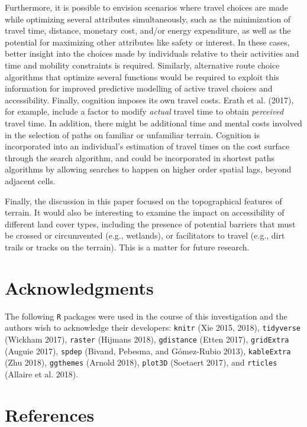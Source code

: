 \documentclass[]{elsarticle} %
\begin{document}
Furthermore, it is possible to envision scenarios where travel choices
are made while optimizing several attributes simultaneously, such as the
minimization of travel time, distance, monetary cost, and/or energy
expenditure, as well as the potential for maximizing other attributes
like safety or interest. In these cases, better insight into the choices
made by individuals relative to their activities and time and mobility
constraints is required. Similarly, alternative route choice algorithms
that optimize several functions would be required to exploit this
information for improved predictive modelling of active travel choices
and accessibility. Finally, cognition imposes its own travel costs.
Erath et al. (2017), for example, include a factor to modify
\emph{actual} travel time to obtain \emph{perceived} travel time. In
addition, there might be additional time and mental costs involved in
the selection of paths on familiar or unfamiliar terrain. Cognition is
incorporated into an individual's estimation of travel times on the cost
surface through the search algorithm, and could be incorporated in
shortest paths algorithms by allowing searches to happen on higher order
spatial lags, beyond adjacent cells.

Finally, the discussion in this paper focused on the topographical
features of terrain. It would also be interesting to examine the impact
on accessibility of different land cover types, including the presence
of potential barriers that must be crossed or circumvented (e.g.,
wetlands), or facilitators to travel (e.g., dirt trails or tracks on the
terrain). This is a matter for future research.

\hypertarget{acknowledgments}{%
\section{Acknowledgments}\label{acknowledgments}}

The following \texttt{R} packages were used in the course of this
investigation and the authors wish to acknowledge their developers:
\texttt{knitr} (Xie 2015, 2018), \texttt{tidyverse} (Wickham 2017),
\texttt{raster} (Hijmans 2018), \texttt{gdistance} (Etten 2017),
\texttt{gridExtra} (Auguie 2017), \texttt{spdep} (Bivand, Pebesma, and
Gómez-Rubio 2013), \texttt{kableExtra} (Zhu 2018), \texttt{ggthemes}
(Arnold 2018), \texttt{plot3D} (Soetaert 2017), and \texttt{rticles}
(Allaire et al. 2018).

\hypertarget{references}{%
\section*{References}\label{references}}
\end{document}

